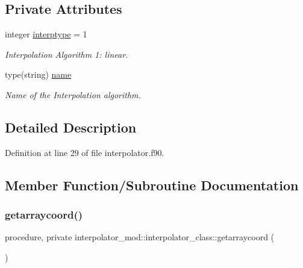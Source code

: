 \subsection*{Private Attributes}
\begin{DoxyCompactItemize}
\item 
integer \mbox{\hyperlink{structinterpolator__mod_1_1interpolator__class_afdfac8b305fd660e113fcc4b2145a8da}{interptype}} = 1
\begin{DoxyCompactList}\small\item\em Interpolation Algorithm 1\+: linear. \end{DoxyCompactList}\item 
type(string) \mbox{\hyperlink{structinterpolator__mod_1_1interpolator__class_ac0d7be3d07fb72dec420461e031d6983}{name}}
\begin{DoxyCompactList}\small\item\em Name of the Interpolation algorithm. \end{DoxyCompactList}\end{DoxyCompactItemize}


\subsection{Detailed Description}


Definition at line 29 of file interpolator.\+f90.



\subsection{Member Function/\+Subroutine Documentation}
\mbox{\label{structinterpolator__mod_1_1interpolator__class_a63c210046b0aaacf729778f802335e3b}} 
\subsubsection{\texorpdfstring{getarraycoord()}{getarraycoord()}}
{\footnotesize\ttfamily procedure, private interpolator\+\_\+mod\+::interpolator\+\_\+class\+::getarraycoord (\begin{DoxyParamCaption}{ }\end{DoxyParamCaption})\hspace{0.3cm}{\ttfamily [private]}}



